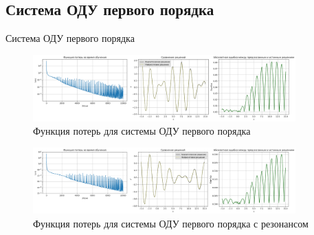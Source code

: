 \documentclass{beamer}
\begin{document}
\subsection{Система ОДУ первого порядка}
\begin{frame}{Система ОДУ первого порядка}
    \begin{figure}[h!]
        \centering
        \includegraphics[width=0.9\textwidth]{images/Loss&x_ODE_of_the_first_order.png}
        \caption{Функция потерь для системы ОДУ первого порядка}
        \label{fig:loss_first_order}
    \end{figure}
    \begin{figure}[h!]
        \centering
        \includegraphics[width=0.9\textwidth]{images/Loss&x_ODE_of_the_first_order_resonance.png}
        \caption{Функция потерь для системы ОДУ первого порядка с резонансом}
        \label{fig:loss_first_order_resonance}
    \end{figure}
\end{frame}
\end{document}
